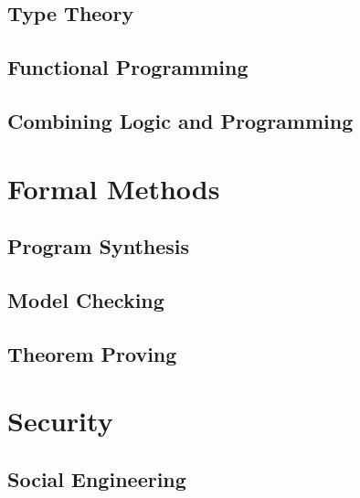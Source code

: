 \documentclass{book}
\begin{document}

   
  \chapter{Type Theory}

  \chapter{Functional Programming}

  \chapter{Combining Logic and Programming}

\part{Formal Methods}

%
  \chapter{Program Synthesis} %

  \chapter{Model Checking} %
    

  \chapter{Theorem Proving} %
   

\part{Security}

  \chapter{Social Engineering}
\end{document}
